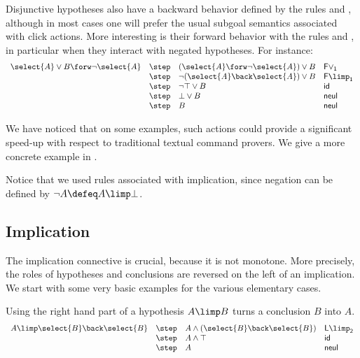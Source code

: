 Disjunctive hypotheses also have a backward behavior defined by the rules
 and , although in most cases one will prefer the
usual subgoal semantics associated with click actions. More interesting is
their forward behavior with the rules  and , in
particular when they interact with negated hypotheses. For instance:
$$
\begin{array}{llll}
  \select{A} \lor B \forw \neg \select{A}
    & \step & (\select{A} \forw \neg\select{A}) \lor B &\mathsf{F\lor_1}\\
    & \step & \neg (\select{A} \back \select{A}) \lor B &\mathsf{F{\limp}_1}\\
    & \step & \neg \top \lor B &\mathsf{id}\\
    & \step & \bot \lor B &\mathsf{neul}\\
    & \step & B &\mathsf{neul}\\
\end{array}
$$

We have noticed that on some examples, such actions could provide a
significant speed-up with respect to traditional textual command
provers. We give a more concrete example in .

Notice that we used rules associated with implication, since negation can be
defined by $\neg A \defeq A \limp \bot$.

\subsection{Implication}
The implication connective is crucial, because it is not monotone. More
precisely, the roles of hypotheses and conclusions are reversed on the
left of an implication. We start with some very basic examples
for the various elementary cases.

Using the right hand part of a hypothesis $A\limp B$ turns a 
conclusion $B$ into $A$. 
$$
\begin{array}{llll}
  A\limp \select{B} \back \select{B} &\step& A\land (\select{B}
                                                \back
                                                \select{B})&\mathsf{L
                                                             {\limp}_2}\\
                                         &\step&A\land\top & \mathsf{id}\\
    &\step& A&\mathsf{neul}
\end{array}
$$

